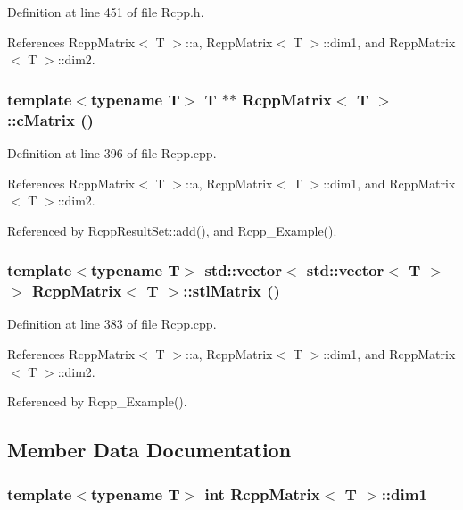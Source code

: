 Definition at line 451 of file Rcpp.h.

References RcppMatrix$<$ T $>$::a, RcppMatrix$<$ T $>$::dim1, and RcppMatrix$<$ T $>$::dim2.\hypertarget{classRcppMatrix_e94a95b2125bd594965e26a93c994da4}{
\subsubsection[cMatrix]{\setlength{\rightskip}{0pt plus 5cm}template$<$typename T$>$ T $\ast$$\ast$ {\bf RcppMatrix}$<$ T $>$::cMatrix ()}}
\label{classRcppMatrix_e94a95b2125bd594965e26a93c994da4}




Definition at line 396 of file Rcpp.cpp.

References RcppMatrix$<$ T $>$::a, RcppMatrix$<$ T $>$::dim1, and RcppMatrix$<$ T $>$::dim2.

Referenced by RcppResultSet::add(), and Rcpp\_\-Example().\hypertarget{classRcppMatrix_e74547edb5d989adb87b2e483153de89}{
\subsubsection[stlMatrix]{\setlength{\rightskip}{0pt plus 5cm}template$<$typename T$>$ std::vector$<$ std::vector$<$ T $>$ $>$ {\bf RcppMatrix}$<$ T $>$::stlMatrix ()}}
\label{classRcppMatrix_e74547edb5d989adb87b2e483153de89}




Definition at line 383 of file Rcpp.cpp.

References RcppMatrix$<$ T $>$::a, RcppMatrix$<$ T $>$::dim1, and RcppMatrix$<$ T $>$::dim2.

Referenced by Rcpp\_\-Example().

\subsection{Member Data Documentation}
\hypertarget{classRcppMatrix_3b2f3ef7c2b482e4f7e7f4f96b787128}{
\subsubsection[dim1]{\setlength{\rightskip}{0pt plus 5cm}template$<$typename T$>$ int {\bf RcppMatrix}$<$ T $>$::{\bf dim1}}}
\label{classRcppMatrix_3b2f3ef7c2b482e4f7e7f4f96b787128}




